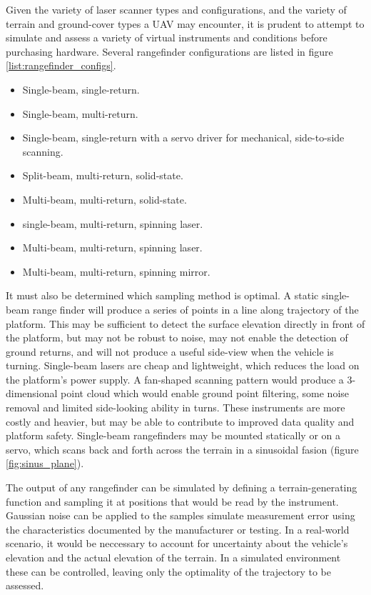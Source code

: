 \documentclass[10pt,a4paper]{report}
\begin{document}
Given the variety of laser scanner types and configurations, and the variety of terrain and ground-cover types a UAV may encounter, it is prudent to attempt to simulate and assess a variety of virtual instruments and conditions before purchasing hardware. Several rangefinder configurations are listed in figure \ref{list:rangefinder_configs}.

\begin{itemize}
\item Single-beam, single-return.
\item Single-beam, multi-return.
\item Single-beam, single-return with a servo driver for mechanical, side-to-side scanning.
\item Split-beam, multi-return, solid-state.
\item Multi-beam, multi-return, solid-state.
\item single-beam, multi-return, spinning laser.
\item Multi-beam, multi-return, spinning laser.
\item Multi-beam, multi-return, spinning mirror.
\label{list:rangefinder_configs}
\end{itemize}

It must also be determined which sampling method is optimal. A static single-beam range finder will produce a series of points in a line along trajectory of the platform. This may be sufficient to detect the surface elevation directly in front of the platform, but may not be robust to noise, may not enable the detection of ground returns, and will not produce a useful side-view when the vehicle is turning. Single-beam lasers are cheap and lightweight, which reduces the load on the platform's power supply. A fan-shaped scanning pattern would produce a 3-dimensional point cloud which would enable ground point filtering, some noise removal and limited side-looking ability in turns. These instruments are more costly and heavier, but may be able to contribute to improved data quality and platform safety. Single-beam rangefinders may be mounted statically or on a servo, which scans back and forth across the terrain in a sinusoidal fasion (figure \ref{fig:sinus_plane}).

The output of any rangefinder can be simulated by defining a terrain-generating function and sampling it at positions that would be read by the instrument. Gaussian noise can be applied to the samples simulate measurement error using the characteristics documented by the manufacturer or testing. In a real-world scenario, it would be neccessary to account for uncertainty about the vehicle's elevation and the actual elevation of the terrain. In a simulated environment these can be controlled, leaving only the optimality of the trajectory to be assessed.
\end{document}

